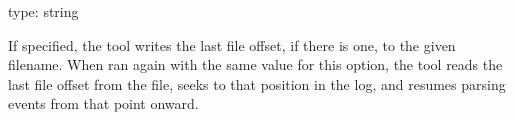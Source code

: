 \documentclass[letterpaper,10pt,english]{sphinxmanual}
\begin{document}
\begin{fulllineitems}
\label{\detokenize{mariadb-query-digest:cmdoption-mariadb-query-digest-resume}}
\sphinxAtStartPar
type: string

\sphinxAtStartPar
If specified, the tool writes the last file offset, if there is one,
to the given filename. When ran again with the same value for this option,
the tool reads the last file offset from the file, seeks to that position
in the log, and resumes parsing events from that point onward.

\end{fulllineitems}

\end{document}
